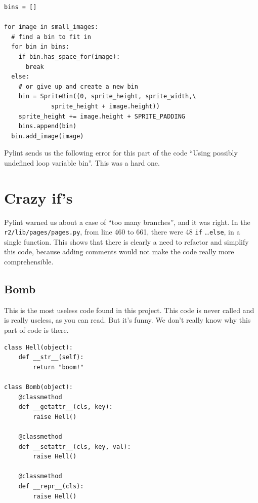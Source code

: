 \documentclass[11pt, a4paper]{article}
\newcommand{\pyl}{\textsf{Pylint}}
\begin{document}
\begin{lstlisting}[caption=\texttt{r2/lib/nymph.py} at lines 123-135]
bins = []

for image in small_images:
  # find a bin to fit in
  for bin in bins:
    if bin.has_space_for(image):
      break
  else:
    # or give up and create a new bin
    bin = SpriteBin((0, sprite_height, sprite_width,\
    		 sprite_height + image.height))
    sprite_height += image.height + SPRITE_PADDING
    bins.append(bin)
  bin.add_image(image)
\end{lstlisting}


\pyl{} sends us the following error for this part of the code \enquote{Using possibly undefined loop variable bin}. This was a hard one.

\section{Crazy if's}

\pyl{} warned us about a case of ``too many branches'', and it was right.
In the \texttt{r2/lib/pages/pages.py}, from line 460 to 661, there were 48 \lstinline|if| \dots \lstinline|else|, in a single function.
This shows that there is clearly a need to refactor and simplify this code, because adding comments would not make the code really more comprehensible.



\subsection{Bomb}

This is the most useless code found in this project. This code is never called and is really useless, as you can read. But it's funny. We don't really know why this part of code is there.

\begin{lstlisting}[caption=\texttt{r2/lib/utils/utils.py}]
class Hell(object):
    def __str__(self):
        return "boom!"

class Bomb(object):
    @classmethod
    def __getattr__(cls, key):
        raise Hell()

    @classmethod
    def __setattr__(cls, key, val):
        raise Hell()

    @classmethod
    def __repr__(cls):
        raise Hell()
\end{lstlisting}
\end{document}
